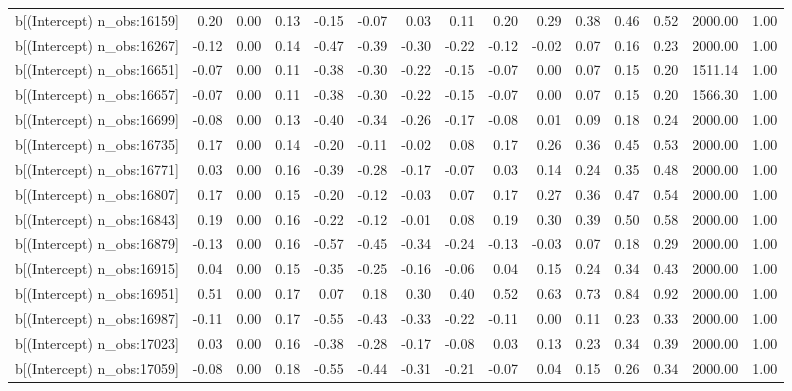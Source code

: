 \begin{table}[ht]
\begin{tabular}{rrrrrrrrrrrrrrr}
  b[(Intercept) n\_obs:16159] & 0.20 & 0.00 & 0.13 & -0.15 & -0.07 & 0.03 & 0.11 & 0.20 & 0.29 & 0.38 & 0.46 & 0.52 & 2000.00 & 1.00 \\ 
  b[(Intercept) n\_obs:16267] & -0.12 & 0.00 & 0.14 & -0.47 & -0.39 & -0.30 & -0.22 & -0.12 & -0.02 & 0.07 & 0.16 & 0.23 & 2000.00 & 1.00 \\ 
  b[(Intercept) n\_obs:16651] & -0.07 & 0.00 & 0.11 & -0.38 & -0.30 & -0.22 & -0.15 & -0.07 & 0.00 & 0.07 & 0.15 & 0.20 & 1511.14 & 1.00 \\ 
  b[(Intercept) n\_obs:16657] & -0.07 & 0.00 & 0.11 & -0.38 & -0.30 & -0.22 & -0.15 & -0.07 & 0.00 & 0.07 & 0.15 & 0.20 & 1566.30 & 1.00 \\ 
  b[(Intercept) n\_obs:16699] & -0.08 & 0.00 & 0.13 & -0.40 & -0.34 & -0.26 & -0.17 & -0.08 & 0.01 & 0.09 & 0.18 & 0.24 & 2000.00 & 1.00 \\ 
  b[(Intercept) n\_obs:16735] & 0.17 & 0.00 & 0.14 & -0.20 & -0.11 & -0.02 & 0.08 & 0.17 & 0.26 & 0.36 & 0.45 & 0.53 & 2000.00 & 1.00 \\ 
  b[(Intercept) n\_obs:16771] & 0.03 & 0.00 & 0.16 & -0.39 & -0.28 & -0.17 & -0.07 & 0.03 & 0.14 & 0.24 & 0.35 & 0.48 & 2000.00 & 1.00 \\ 
  b[(Intercept) n\_obs:16807] & 0.17 & 0.00 & 0.15 & -0.20 & -0.12 & -0.03 & 0.07 & 0.17 & 0.27 & 0.36 & 0.47 & 0.54 & 2000.00 & 1.00 \\ 
  b[(Intercept) n\_obs:16843] & 0.19 & 0.00 & 0.16 & -0.22 & -0.12 & -0.01 & 0.08 & 0.19 & 0.30 & 0.39 & 0.50 & 0.58 & 2000.00 & 1.00 \\ 
  b[(Intercept) n\_obs:16879] & -0.13 & 0.00 & 0.16 & -0.57 & -0.45 & -0.34 & -0.24 & -0.13 & -0.03 & 0.07 & 0.18 & 0.29 & 2000.00 & 1.00 \\ 
  b[(Intercept) n\_obs:16915] & 0.04 & 0.00 & 0.15 & -0.35 & -0.25 & -0.16 & -0.06 & 0.04 & 0.15 & 0.24 & 0.34 & 0.43 & 2000.00 & 1.00 \\ 
  b[(Intercept) n\_obs:16951] & 0.51 & 0.00 & 0.17 & 0.07 & 0.18 & 0.30 & 0.40 & 0.52 & 0.63 & 0.73 & 0.84 & 0.92 & 2000.00 & 1.00 \\ 
  b[(Intercept) n\_obs:16987] & -0.11 & 0.00 & 0.17 & -0.55 & -0.43 & -0.33 & -0.22 & -0.11 & 0.00 & 0.11 & 0.23 & 0.33 & 2000.00 & 1.00 \\ 
  b[(Intercept) n\_obs:17023] & 0.03 & 0.00 & 0.16 & -0.38 & -0.28 & -0.17 & -0.08 & 0.03 & 0.13 & 0.23 & 0.34 & 0.39 & 2000.00 & 1.00 \\ 
  b[(Intercept) n\_obs:17059] & -0.08 & 0.00 & 0.18 & -0.55 & -0.44 & -0.31 & -0.21 & -0.07 & 0.04 & 0.15 & 0.26 & 0.34 & 2000.00 & 1.00 \\ 

\end{tabular}
\end{table}
